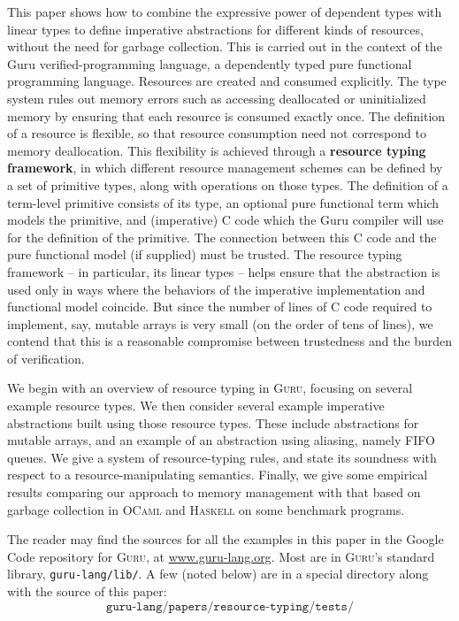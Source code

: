 \documentclass[9pt,natbib]{sigplanconf}
\begin{document}
This paper shows how to combine the expressive power of dependent
types with linear types to define imperative abstractions for
different kinds of resources, without the need for garbage collection.
This is carried out in the context of the Guru verified-programming
language, a dependently typed pure functional programming language.
Resources are created and consumed explicitly.  The type system rules
out memory errors such as accessing deallocated or uninitialized
memory by ensuring that each resource is consumed exactly once.  The
definition of a resource is flexible, so that resource consumption
need not correspond to memory deallocation.  This flexibility is
achieved through a \textbf{resource typing framework}, in which
different resource management schemes can be defined by a set of
primitive types, along with operations on those types.  The definition
of a term-level primitive consists of its type, an optional pure
functional term which models the primitive, and (imperative) C code
which the Guru compiler will use for the definition of the primitive.
The connection between this C code and the pure functional model (if
supplied) must be trusted.  The resource typing framework -- in
particular, its linear types -- helps ensure that the abstraction is
used only in ways where the behaviors of the imperative implementation
and functional model coincide.  But since the number of lines of C
code required to implement, say, mutable arrays is very small (on the
order of tens of lines), we contend that this is a reasonable
compromise between trustedness and the burden of verification.

We begin with an overview of resource typing in \textsc{Guru},
focusing on several example resource types.  We then consider several
example imperative abstractions built using those resource types.
These include abstractions for mutable arrays, and an example of an
abstraction using aliasing, namely FIFO queues.  We give a system of
resource-typing rules, and state its soundness with respect to a
resource-manipulating semantics.  Finally, we give some empirical
results comparing our approach to memory management with that based on
garbage collection in \textsc{OCaml} and \textsc{Haskell} on some
benchmark programs.

The reader may find the sources for all the examples in this paper in
the Google Code repository for \textsc{Guru}, at
\url{www.guru-lang.org}.  Most are in \textsc{Guru}'s standard
library, \texttt{guru-lang/lib/}.  A few (noted below) are in a
special directory along with the source of this paper:
\[
\texttt{guru-lang/papers/resource-typing/tests/}
\]
\end{document}
